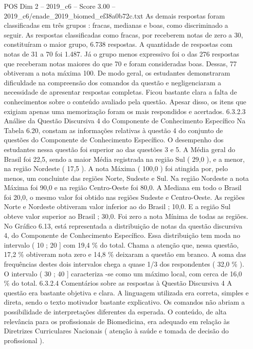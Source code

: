 \begin{textsample}{POS Dim 2 – 2019\_c6 – Score 3.00 – 2019\_c6/enade\_2019\_biomed\_ef38a0b72c.txt}
As demais respostas foram classificadas em três grupos : fracas, medianas e boas, como discriminado a seguir.
As respostas classificadas como fracas, por receberem notas de zero a 30, constituíram o maior grupo, 6.738 respostas.
A quantidade de respostas com notas de 31 a 70 foi 1.487.
Já o grupo menos expressivo foi o das 276 respostas que receberam notas maiores do que 70 e foram consideradas boas.
Dessas, 77 obtiveram a nota máxima 100.
De modo geral, os estudantes demonstraram dificuldade na compreensão dos comandos da questão e negligenciaram a necessidade de apresentar respostas completas.
Ficou bastante clara a falta de conhecimentos sobre o conteúdo avaliado pela questão.
Apesar disso, os itens que exigiam apenas uma memorização foram os mais respondidos e acertados. 6.3.2.3 Análise da Questão Discursiva 4 do Componente de Conhecimento Específico Na Tabela 6.20, constam as informações relativas à questão 4 do conjunto de questões do Componente de Conhecimento Específico.
O desempenho dos estudantes nessa questão foi superior ao das questões 3 e 5.
A Média geral do Brasil foi 22,5, sendo a maior Média registrada na região Sul ( 29,0 ), e a menor, na região Nordeste ( 17,5 ).
A nota Máxima ( 100,0 ) foi atingida por, pelo menos, um concluinte das regiões Norte, Sudeste e Sul.
Na região Nordeste a nota Máxima foi 90,0 e na região Centro-Oeste foi 80,0.
A Mediana em todo o Brasil foi 20,0, o mesmo valor foi obtido nas regiões Sudeste e Centro-Oeste.
As regiões Norte e Nordeste obtiveram valor inferior ao do Brasil ; 10,0.
E a região Sul obteve valor superior ao Brasil ; 30,0.
Foi zero a nota Mínima de todas as regiões.
No Gráfico 6.13, está representada a distribuição de notas da questão discursiva 4, do Componente de Conhecimento Específico.
Essa distribuição tem moda no intervalo ( 10 ; 20 ] com 19,4 \% do total.
Chama a atenção que, nessa questão, 17,2 \% obtiveram nota zero e 14,8 \% deixaram a questão em branco.
A soma das frequências destes dois intervalos chega a quase 1/3 dos respondentes ( 32,0 \% ).
O intervalo ( 30 ; 40 ] caracteriza -se como um máximo local, com cerca de 16,0 \% do total. 6.3.2.4 Comentários sobre as respostas à Questão Discursiva 4 A questão era bastante objetiva e clara.
A linguagem utilizada era correta, simples e direta, sendo o texto motivador bastante explicativo.
Os comandos não abriam a possibilidade de interpretações diferentes da esperada.
O conteúdo, de alta relevância para os profissionais de Biomedicina, era adequado em relação às Diretrizes Curriculares Nacionais ( atenção à saúde e tomada de decisão do profissional ).

\end{textsample}
